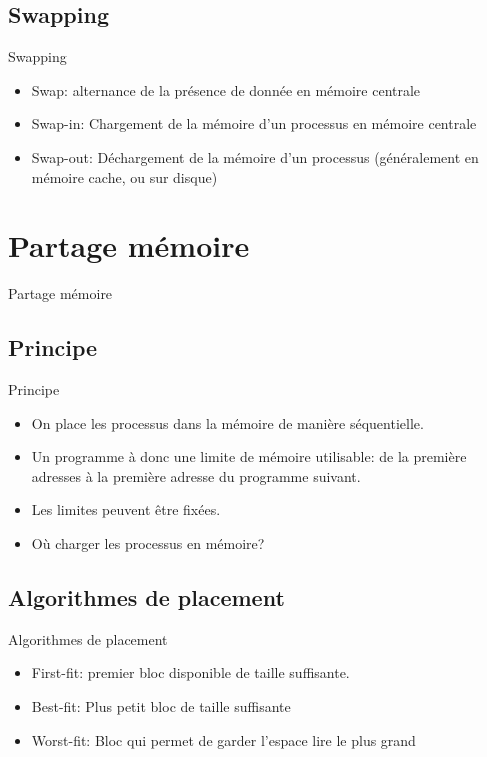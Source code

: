 \begin{frame}{\sectitle}
    \def\subsectitle{Swapping}
    \subsection{\subsectitle}
    \begin{block}{\subsectitle}
        \begin{itemize}
            \item Swap: alternance de la présence de donnée en mémoire centrale
            \item Swap-in: Chargement de la mémoire d'un processus en mémoire
                centrale
            \item Swap-out: Déchargement de la mémoire d'un processus
                (généralement en mémoire cache, ou sur disque)
        \end{itemize}
    \end{block}
\end{frame}

\def\sectitle{Partage mémoire}
\section{\sectitle}
\begin{frame}{\sectitle}
\def\subsectitle{Principe}
\subsection{\subsectitle}
\begin{block}{\subsectitle}
\begin{itemize}
    \item On place les processus dans la mémoire de manière séquentielle.
    \item Un programme à donc une limite de mémoire utilisable: de la première
    adresses à la première adresse du programme suivant.
    \item Les limites peuvent être fixées.
    \item Où charger les processus en mémoire?
\end{itemize}
\end{block}

\def\subsectitle{Algorithmes de placement}
\subsection{\subsectitle}
\begin{block}{\subsectitle}
\begin{itemize}
    \item First-fit: premier bloc disponible de taille suffisante.
    \item Best-fit: Plus petit bloc de taille suffisante
    \item Worst-fit: Bloc qui permet de garder l'espace lire le plus grand
\end{itemize}
\end{block}
\end{frame}


